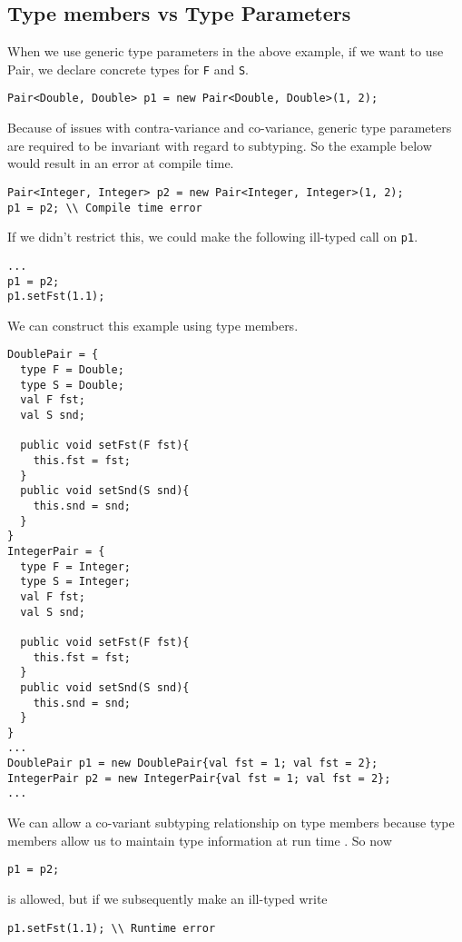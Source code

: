 \documentclass{llncs}
\begin{document}
\subsection{Type members vs Type Parameters}
When we use generic type parameters in the above example, 
if we want to use Pair, we declare  
concrete types for \texttt{F} and \texttt{S}.
\begin{lstlisting}[mathescape, style=custom_lang]
Pair<Double, Double> p1 = new Pair<Double, Double>(1, 2);
\end{lstlisting}
Because of issues with contra-variance and co-variance, 
generic type parameters are required to be invariant with 
regard to subtyping. So the example below would result in 
an error at compile time. 
\begin{lstlisting}[mathescape, style=custom_lang]
Pair<Integer, Integer> p2 = new Pair<Integer, Integer>(1, 2);
p1 = p2; \\ Compile time error
\end{lstlisting}
If we didn't restrict this, we could make the following 
ill-typed call on \texttt{p1}.
\begin{lstlisting}[mathescape, style=custom_lang]
...
p1 = p2;
p1.setFst(1.1);
\end{lstlisting}
We can construct this example using type members.
\begin{lstlisting}[mathescape, style=custom_lang]
DoublePair = {
  type F = Double;
  type S = Double;
  val F fst;
  val S snd;

  public void setFst(F fst){
    this.fst = fst;
  }
  public void setSnd(S snd){
    this.snd = snd;
  }
}
IntegerPair = {
  type F = Integer;
  type S = Integer;
  val F fst;
  val S snd;

  public void setFst(F fst){
    this.fst = fst;
  }
  public void setSnd(S snd){
    this.snd = snd;
  }
}
...
DoublePair p1 = new DoublePair{val fst = 1; val fst = 2};
IntegerPair p2 = new IntegerPair{val fst = 1; val fst = 2};
...
\end{lstlisting}
We can allow a co-variant subtyping relationship 
on type members because type members allow us to 
maintain type information at run time \cite{Bruce:1998}. So now %
\begin{lstlisting}[mathescape, style=custom_lang]
p1 = p2;
\end{lstlisting}
is allowed, but if we subsequently make an ill-typed 
write
\begin{lstlisting}[mathescape, style=custom_lang]
p1.setFst(1.1); \\ Runtime error
\end{lstlisting}
\end{document}
